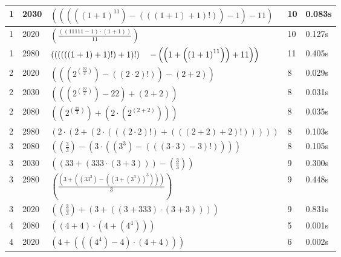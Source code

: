 \documentclass{article}
\theoremstyle{nonumberplain}
\newcommand{\nldelims}[1]{\right.#1\left.}
\newcommand{\mnl}{\nldelims{\newline}}
\begin{document}
\begin{center}
\begin{longtable}{ | l | l | p{9.5cm} | l | l | }
            1 & 2030 & \( \left(\left(\left(\left({\left(1 + 1\right)}^{11}\right) - \left(\left(\left(1 + 1\right) + 1\right)!\right)\right) - 1\right) - 11\right) \) & 10 & 0.083s \\\hline
            1 & 2020 & \( \left(\frac{\left(\left(11111 - 1\right) \cdot \left(1 + 1\right)\right)}{11}\right) \) & 10 & 0.127s \\\hline
            1 & 2980 & \( \left(\left(\left(\left(\left(\left(1 + 1\right) + 1\right)!\right) + 1\right)!\right) \mnl\ \ - \left(\left(1 + \left({\left(1 + 1\right)}^{11}\right)\right) + 11\right)\right) \) & 11 & 0.405s \\\hline
            2 & 2020 & \( \left(\left(\left({2}^{\left(\frac{22}{2}\right)}\right) - \left(\left(2 \cdot 2\right)!\right)\right) - \left(2 + 2\right)\right) \) & 8 & 0.029s \\\hline
            2 & 2030 & \( \left(\left(\left({2}^{\left(\frac{22}{2}\right)}\right) - 22\right) + \left(2 + 2\right)\right) \) & 8 & 0.031s \\\hline
            2 & 2080 & \( \left(\left({2}^{\left(\frac{22}{2}\right)}\right) + \left(2 \cdot \left({2}^{\left(2 + 2\right)}\right)\right)\right) \) & 8 & 0.035s \\\hline
            2 & 2980 & \( \left(2 \cdot \left(2 + \left(2 \cdot \left(\left(\left(2 \cdot 2\right)!\right) + \left(\left(\left(2 + 2\right) + 2\right)!\right)\right)\right)\right)\right) \) & 8 & 0.103s \\\hline
            3 & 2080 & \( \left(\left(\frac{3}{3}\right) - \left(3 \cdot \left(\left({3}^{3}\right) - \left(\left(\left(3 \cdot 3\right) - 3\right)!\right)\right)\right)\right) \) & 8 & 0.105s \\\hline
            3 & 2030 & \( \left(\left(33 + \left(333 \cdot \left(3 + 3\right)\right)\right) - \left(\frac{3}{3}\right)\right) \) & 9 & 0.300s \\\hline
            3 & 2980 & \( \left(\frac{\left(3 + \left(\left({33}^{3}\right) - \left({\left(3 + \left({3}^{3}\right)\right)}^{3}\right)\right)\right)}{3}\right) \) & 9 & 0.448s \\\hline
            3 & 2020 & \( \left(\left(\frac{3}{3}\right) + \left(3 + \left(\left(3 + 333\right) \cdot \left(3 + 3\right)\right)\right)\right) \) & 9 & 0.831s \\\hline
            4 & 2080 & \( \left(\left(4 + 4\right) \cdot \left(4 + \left({4}^{4}\right)\right)\right) \) & 5 & 0.001s \\\hline
            4 & 2020 & \( \left(4 + \left(\left(\left({4}^{4}\right) - 4\right) \cdot \left(4 + 4\right)\right)\right) \) & 6 & 0.002s \\\hline

\end{longtable}
\end{center}
\end{document}
